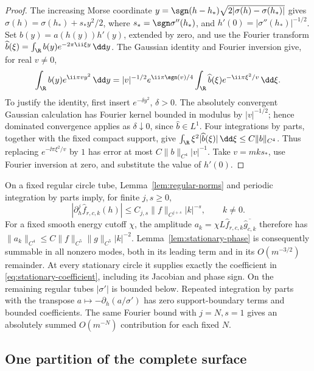 \begin{proof}
The increasing Morse coordinate
\(y=\sgn(h-h_*)\sqrt{2|\sigma(h)-\sigma(h_*)|}\) gives
\(\sigma(h)=\sigma(h_*)+s_*y^2/2\), where
\(s_*=\sgn\sigma''(h_*)\), and
\(h'(0)=|\sigma''(h_*)|^{-1/2}\).
Set \(b(y)=a(h(y))h'(y)\), extended by zero, and use the Fourier transform
\(\widehat b(\xi)=\int_\R b(y)e^{-2\pi\ii\xi y}\,\dd y\).
The Gaussian identity and Fourier inversion give, for real \(v\ne0\),
\[
 \int_\R b(y)e^{\ii\pi vy^2}\,\dd y
 =|v|^{-1/2}e^{\ii\pi\sgn(v)/4}
   \int_\R\widehat b(\xi)e^{-\ii\pi\xi^2/v}\,\dd\xi.
\]
To justify the identity, first insert \(e^{-\delta y^2}\), \(\delta>0\).
The absolutely convergent Gaussian calculation has Fourier kernel bounded
in modulus by \(|v|^{-1/2}\); hence dominated convergence applies as
\(\delta\downarrow0\), since \(\widehat b\in L^1\).
Four integrations by parts, together with the fixed compact support, give
\(\int_\R\xi^2|\widehat b(\xi)|\,\dd\xi\leq C\|b\|_{C^4}\).
Thus replacing \(e^{-\ii\pi\xi^2/v}\) by \(1\) has error at most
\(C\|b\|_{C^4}|v|^{-1}\). Take \(v=mk s_*\), use Fourier inversion at zero,
and substitute the value of \(h'(0)\).
\end{proof}

On a fixed regular circle tube, Lemma~\ref{lem:regular-norms} and periodic
integration by parts imply, for finite \(j,s\geq0\),
\[
 |\partial_h^j\widehat f_{r,c,k}(h)|
 \leq C_{j,s}\|f\|_{C^{j+s}}|k|^{-s},\qquad k\ne0.
\]
For a fixed smooth energy cutoff \(\chi\), the amplitude
\(a_k=\chi L\widehat f_{r,c,k}\overline{\widehat g_{c,k}}\)
therefore has
\(\|a_k\|_{C^4}\leq C\|f\|_{C^5}\|g\|_{C^5}|k|^{-2}\).
Lemma~\ref{lem:stationary-phase} is consequently summable in all nonzero
modes, both in its leading term and in its \(O(m^{-3/2})\) remainder.
At every stationary circle it supplies exactly the coefficient in
\eqref{eq:stationary-coefficient}, including its Jacobian and phase sign.
On the remaining regular tubes \(|\sigma'|\) is bounded below. Repeated
integration by parts with the transpose
\(a\mapsto-\partial_h(a/\sigma')\) has zero support-boundary terms and
bounded coefficients. The same Fourier bound with \(j=N,s=1\) gives
an absolutely summed \(O(m^{-N})\) contribution for each fixed \(N\).

\subsection{One partition of the complete surface}


